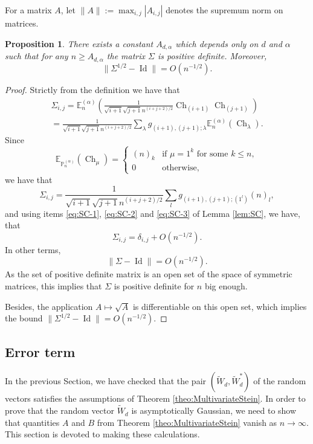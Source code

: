 \documentclass[11pt]{amsart}
\theoremstyle{plain}
\newtheorem{proposition}[lemma]{Proposition}
\theoremstyle{remark}
\newcommand{\PP}{\mathbb{P}}
\newcommand{\esper}{\mathbb{E}}
\DeclareMathOperator{\Id}{Id}
\DeclareMathOperator{\Ch}{Ch}
\begin{document}
For a matrix $A$, let $\lVert A \rVert:=\max_{i,j} |A_{i,j}|$ denotes
the supremum norm on matrices.

\begin{proposition}
\label{prop:SteinCondition2}
There exists a constant $A_{d,\alpha}$ which depends only on $d$ and $\alpha$ such that for any $n \geq A_{d,\alpha}$ the matrix $\varSigma$ is positive definite. Moreover,
\[ \lVert \varSigma^{1/2} - \Id \rVert = O(n^{-1/2}).\]
\end{proposition}

\begin{proof}
Strictly from the definition we have that
 \begin{multline} 
 \varSigma_{i,j} = \esper_n^{(\alpha)} \left( \frac{1}{\sqrt{i+1}\sqrt{j+1} n^{(i+j+2)/2}} \Ch_{(i+1)} \Ch_{(j+1)} \right) \\
 = \frac{1}{\sqrt{i+1}\sqrt{j+1} n^{(i+j+2)/2}} \sum_\lambda g_{(i+1),(j+1);\lambda} \esper_n^{(\alpha)}(\Ch_\lambda). 
 \end{multline}
Since
\[\esper_{\PP_n^{(\alpha)}}(\Ch_\mu)=\begin{cases}
    (n)_k & \text{if }\mu=1^k \text{ for some }k \leq n,\\
    0   & \text{otherwise,}
\end{cases}\]
we have that
\[  \varSigma_{i,j} = \frac{1}{\sqrt{i+1}\sqrt{j+1} n^{(i+j+2)/2}} \sum_l g_{(i+1),(j+1);(1^l)} (n)_l, \]
and using items \eqref{eq:SC-1}, \eqref{eq:SC-2} and \eqref{eq:SC-3} of Lemma \ref{lem:SC},
we have, that
\[ \varSigma_{i,j} = \delta_{i,j} + O(n^{-1/2}).\]
In other terms,
\[ \lVert \varSigma - \Id \rVert = O(n^{-1/2}).\]
As the set of positive definite matrix is an open set of the space
of symmetric matrices, this implies that $\varSigma$ is positive definite
for $n$ big enough.

Besides, the application $A \mapsto \sqrt{A}$ is differentiable on this open set,
which implies the bound
$ \lVert \varSigma^{1/2} - \Id \rVert = O(n^{-1/2})$.
\end{proof}

\subsection{Error term}
\label{subsec:ErrorTerm}
In the previous Section, we have checked that the pair $(\tilde{W}_d, \tilde{W}_d^*)$ of the random vectors satisfies the assumptions of Theorem \ref{theo:MultivariateStein}.
In order to prove that the random vector $\tilde{W}_d$ is asymptotically Gaussian, we need to show that
quantities $A$ and $B$ from Theorem \ref{theo:MultivariateStein} vanish as $n \to \infty$. 
This section is devoted to making these calculations. 
\end{document}
